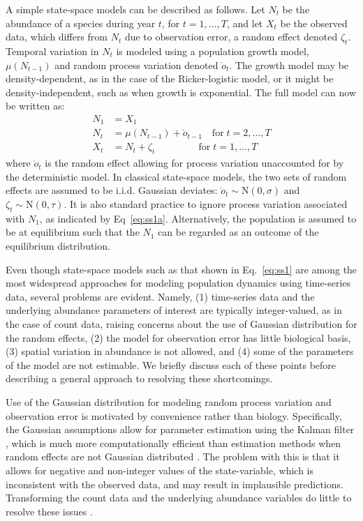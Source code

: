 \documentclass[12pt]{article}
\begin{document}
A simple state-space models can be described as follows.
Let $N_t$ be the abundance of a species during year $t$, for
$t=1,\hdots,T$, and let $X_t$ be
the observed data, which differs from $N_t$ due to observation error,
a random effect denoted $\zeta_t$. Temporal variation in $N_t$ is
modeled using a population growth model, $\mu(N_{t-1})$
and random process variation denoted $\grave{o}_t$.
The growth model may be density-dependent, as in the case of the 
Ricker-logistic model, or it might be density-independent, such as when growth
is exponential.
The full model can now be written as:
\begin{subequations}
  \label{eq:ss1}
  \begin{align}
    N_1 &= X_1 \label{eq:ss1a} \\
N_t &= \mu(N_{t-1}) + \grave{o}_{t-1} \quad \text{for} \;
t=2,\hdots,T \label{eq:ss1b} \\
X_t &= N_t + \zeta_t \qquad \qquad \;\, \text{for} \;
t=1,\hdots,T \label{eq:ss1c}
  \end{align}
\end{subequations}
where $\grave{o}_t$ is the random effect allowing for process
variation unaccounted for by the deterministic model. In classical
state-space models, the two sets of random effects
are assumed to be i.i.d. Gaussian deviates:
$\grave{o}_t \sim \mathrm{N}(0, \sigma)$ and
$\zeta_t \sim \mathrm{N}(0, \tau)$. It is also standard practice to
ignore process variation associated with $N_1$, as
indicated by Eq~\ref{eq:ss1a}. Alternatively, the population is
assumed to be at equilibrium such that the $N_1$ can be regarded as an
outcome of the equilibrium distribution.

Even though state-space models such as that shown in Eq.~\ref{eq:ss1}
are among the most widespread approaches for modeling population dynamics
using time-series data, several problems are evident. Namely, (1)
time-series data and the underlying abundance parameters of interest
are typically integer-valued, as in the case of count data, raising
concerns about the use of Gaussian distribution for the random
effects, (2) the model for observation error has little biological basis, (3)
spatial variation in abundance is not allowed, and (4) some of the
parameters of the model are not estimable. We briefly discuss each of
these points before describing a general approach to resolving these
shortcomings.

Use of the Gaussian distribution for modeling random process variation
and observation error is motivated by convenience rather than
biology. Specifically, the Gaussian assumptions
allow for parameter estimation using the Kalman filter
\citep{dennis_etal:2006}, which is much more computationally efficient
than estimation methods when random effects are not Gaussian distributed
\citep{devalpine_hastings:2002}. The problem with this is that it
allows for negative and non-integer values of the state-variable, which is
inconsistent with the observed data, and may result in implausible predictions.
Transforming the count data and the underlying abundance variables do
little to resolve these issues \citep{ohara_kotze:2010}.
\end{document}
